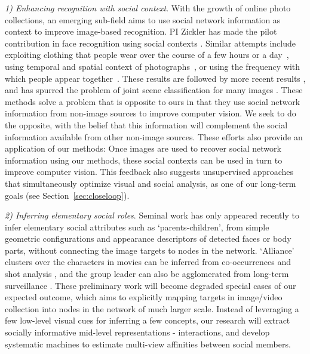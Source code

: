\emph{1) Enhancing recognition with social context}. With the growth of online photo collections, an emerging sub-field aims to use social network information as context to improve image-based recognition. PI Zickler has made the pilot contribution in face recognition using social contexts \cite{Stone2008,Stone2010}. Similar attempts include exploiting clothing that people wear over the course of a few hours or a day~\cite{anguelov2007cir, zhang2003aah,  song2006cah, sivic2006fpr}, using temporal and spatial context of photographs~\cite{naaman2005lcr, zhao2006apa}, or using the frequency with which people appear together~\cite{anguelov2007cir}. These results are followed by more recent results \cite{Dikmen:classify,LeeBMVC2011,Poppe2012}, and has spurred the problem of joint scene classification for many images \cite{McAuley:socialclassify}. These methods solve a problem that is opposite to ours in that they use social network information from non-image sources to improve computer vision. We seek to do the opposite, with the belief that this information will complement the social information available from other non-image sources. These efforts also provide an application of our methods: Once images are used to recover social network information using our methods, these social contexts can be used in turn to improve computer vision. This feedback also suggests unsupervised approaches that simultaneously optimize visual and social analysis, as one of our long-term goals (see Section~\ref{sec:closeloop}).


\emph{2) Inferring elementary social roles}. Seminal work has only appeared recently to infer elementary social attributes such as `parents-children', from simple geometric configurations and appearance descriptors of detected faces or body parts\cite{Gallagher,Wang2010,Murillo2012}, without connecting the image targets to nodes in the network. `Alliance' clusters over the characters in movies can be inferred from co-occurrences and shot analysis \cite{Ding2010,Ding2011}, and the group leader can also be agglomerated from long-term surveillance \cite{Yu2009,Zhang2011}. These preliminary work will become degraded special cases of our expected outcome, which aims to explicitly mapping targets in image/video collection into nodes in the network of much larger scale. Instead of leveraging a few low-level visual cues for inferring a few concepts, our research will extract socially informative mid-level representations - interactions, and develop systematic machines to estimate multi-view affinities between social members.


